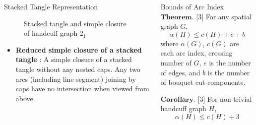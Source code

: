 \documentclass[final]{beamer}
\begin{document}
\begin{frame}[t]
\begin{columns}[t]
\begin{block}{Stacked Tangle Representation}
\begin{figure}
      \caption{Stacked tangle and simple closure of handcuff graph $2_1$}
    \end{figure}
    \begin{itemize}
      \item \textbf{Reduced simple closure of a stacked tangle} : A simple closure of a stacked tangle without any nested caps. Any two arcs (including line segment) joining by caps have no intersection when viewed from above.
    \end{itemize}
  \end{block}

  
  \begin{block}{Bounds of Arc Index}
  $\mathbf{Theorem.}$ $[$3$]$ For any spatial graph $G$, 
  \begin{equation*}
    \alpha(H) \leq c(H) + e + b
  \end{equation*}
  where $\alpha (G)$, $c(G)$ are each arc index, crossing number of $G$, $e$ is the number of edges, and $b$ is the number of bouquet cut-components.
  
  $\mathbf{Corollary.}$ $[$3$]$ For non-trivial handcuff graph $H$,
  \begin{equation*}
    \alpha(H) \leq c(H) + 3
  \end{equation*}





\end{block}
\end{columns}
\end{frame}
\end{document}
